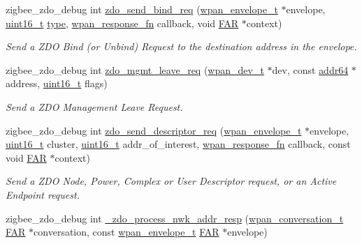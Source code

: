 \begin{DoxyCompactItemize}
zigbee\-\_\-zdo\-\_\-debug int \hyperlink{group__zdo_gab02e4c1584594c0a96d05399bd69bffa}{zdo\-\_\-send\-\_\-bind\-\_\-req} (\hyperlink{structwpan__envelope__t}{wpan\-\_\-envelope\-\_\-t} $\ast$envelope, \hyperlink{group__hal_ga5a8b2dc9e45a9ee81a94ef304fb62505}{uint16\-\_\-t} \hyperlink{group__zcl_ga1d127017fb298b889f4ba24752d08b8e}{type}, \hyperlink{group__wpan__aps_gaffe7bb679e9ba6de49f68fdc584fbefb}{wpan\-\_\-response\-\_\-fn} callback, void \hyperlink{group__hal_gaef060b3456fdcc093a7210a762d5f2ed}{F\-A\-R} $\ast$context)
\begin{DoxyCompactList}\small\item\em Send a Z\-D\-O Bind (or Unbind) Request to the destination address in the envelope. \end{DoxyCompactList}\item 
zigbee\-\_\-zdo\-\_\-debug int \hyperlink{group__zdo_ga4ab17250ec2957d91a6ef4f1377ab62d}{zdo\-\_\-mgmt\-\_\-leave\-\_\-req} (\hyperlink{structwpan__dev__t}{wpan\-\_\-dev\-\_\-t} $\ast$dev, const \hyperlink{unionaddr64}{addr64} $\ast$address, \hyperlink{group__hal_ga5a8b2dc9e45a9ee81a94ef304fb62505}{uint16\-\_\-t} flags)
\begin{DoxyCompactList}\small\item\em Send a Z\-D\-O Management Leave Request. \end{DoxyCompactList}\item 
zigbee\-\_\-zdo\-\_\-debug int \hyperlink{group__zdo_gac842062e5e1a60d25cddf16ec22ef601}{zdo\-\_\-send\-\_\-descriptor\-\_\-req} (\hyperlink{structwpan__envelope__t}{wpan\-\_\-envelope\-\_\-t} $\ast$envelope, \hyperlink{group__hal_ga5a8b2dc9e45a9ee81a94ef304fb62505}{uint16\-\_\-t} cluster, \hyperlink{group__hal_ga5a8b2dc9e45a9ee81a94ef304fb62505}{uint16\-\_\-t} addr\-\_\-of\-\_\-interest, \hyperlink{group__wpan__aps_gaffe7bb679e9ba6de49f68fdc584fbefb}{wpan\-\_\-response\-\_\-fn} callback, const void \hyperlink{group__hal_gaef060b3456fdcc093a7210a762d5f2ed}{F\-A\-R} $\ast$context)
\begin{DoxyCompactList}\small\item\em Send a Z\-D\-O Node, Power, Complex or User Descriptor request, or an Active Endpoint request. \end{DoxyCompactList}\item 
zigbee\-\_\-zdo\-\_\-debug int \hyperlink{group__zdo_ga9c1afb2178cc3e3b515373c7e351fc02}{\-\_\-zdo\-\_\-process\-\_\-nwk\-\_\-addr\-\_\-resp} (\hyperlink{structwpan__conversation__t}{wpan\-\_\-conversation\-\_\-t} \hyperlink{group__hal_gaef060b3456fdcc093a7210a762d5f2ed}{F\-A\-R} $\ast$conversation, const \hyperlink{structwpan__envelope__t}{wpan\-\_\-envelope\-\_\-t} \hyperlink{group__hal_gaef060b3456fdcc093a7210a762d5f2ed}{F\-A\-R} $\ast$envelope)

\end{DoxyCompactItemize}
